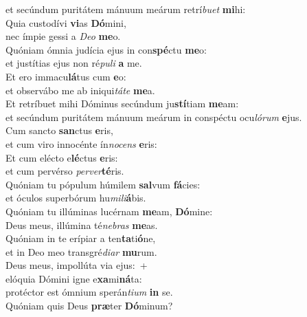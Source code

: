 \oddverse et secúndum puritátem mánuum meárum retrí\textit{bu}\textit{et} \textbf{mi}hi:\\
\evenverse Quia custodívi \textbf{vi}as \textbf{Dó}mini,~\*\\
\evenverse nec ímpie gessi a \textit{De}\textit{o} \textbf{me}o.\\
\oddverse Quóniam ómnia judícia ejus in con\textbf{spé}ctu \textbf{me}o:~\*\\
\oddverse et justítias ejus non ré\textit{pu}\textit{li} \textbf{a} me.\\
\evenverse Et ero immacu\textbf{lá}tus cum \textbf{e}o:~\*\\
\evenverse et observábo me ab iniqui\textit{tá}\textit{te} \textbf{me}a.\\
\oddverse Et retríbuet mihi Dóminus secúndum ju\textbf{stí}tiam \textbf{me}am:~\*\\
\oddverse et secúndum puritátem mánuum meárum in conspéctu ocu\textit{ló}\textit{rum} \textbf{e}jus.\\
\evenverse Cum sancto \textbf{san}ctus \textbf{e}ris,~\*\\
\evenverse et cum viro innocénte ín\textit{no}\textit{cens} \textbf{e}ris:\\
\oddverse Et cum elécto e\textbf{lé}ctus \textbf{e}ris:~\*\\
\oddverse et cum pervérso \textit{per}\textit{ver}\textbf{té}ris.\\
\evenverse Quóniam tu pópulum húmilem \textbf{sal}vum \textbf{fá}cies:~\*\\
\evenverse et óculos superbórum hu\textit{mi}\textit{li}\textbf{á}bis.\\
\oddverse Quóniam tu illúminas lucérnam \textbf{me}am, \textbf{Dó}mine:~\*\\
\oddverse Deus meus, illúmina té\textit{ne}\textit{bras} \textbf{me}as.\\
\evenverse Quóniam in te erípiar a ten\textbf{ta}ti\textbf{ó}ne,~\*\\
\evenverse et in Deo meo transgré\textit{di}\textit{ar} \textbf{mu}rum.\\
\oddverse Deus meus, impollúta via ejus:~+\\
\oddverse  elóquia Dómini igne e\textbf{xa}mi\textbf{ná}ta:~\*\\
\oddverse protéctor est ómnium sperán\textit{ti}\textit{um} \textbf{in} se.\\
\evenverse Quóniam quis Deus \textbf{præ}ter \textbf{Dó}minum?~\*\\
